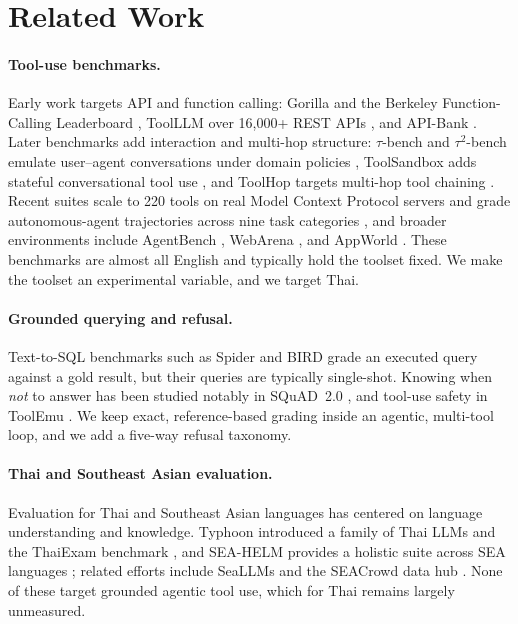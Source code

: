 \documentclass[11pt]{article}
\begin{document}
\section{Related Work}

\paragraph{Tool-use benchmarks.} Early work targets API and function calling: Gorilla
\citep{patil2023gorilla} and the Berkeley Function-Calling Leaderboard \citep{patil2025bfcl}, ToolLLM over
16{,}000+ REST APIs \citep{qin2023toolllm}, and API-Bank \citep{li2023apibank}. Later benchmarks add
interaction and multi-hop structure: $\tau$-bench and $\tau^2$-bench emulate user--agent conversations
under domain policies \citep{yao2024taubench,barres2025tau2bench}, ToolSandbox adds stateful
conversational tool use \citep{lu2024toolsandbox}, and ToolHop targets multi-hop tool chaining
\citep{ye2025toolhop}. Recent suites scale to 220 tools on real Model Context Protocol servers
\citep{bandi2026mcpatlas} and grade autonomous-agent trajectories across nine task categories
\citep{ye2026claweval}, and broader environments include AgentBench \citep{liu2023agentbench}, WebArena
\citep{zhou2023webarena}, and AppWorld \citep{trivedi2024appworld}. These benchmarks are almost all
English and typically hold the toolset fixed. We make the toolset an experimental variable, and we
target Thai.

\paragraph{Grounded querying and refusal.} Text-to-SQL benchmarks such as Spider \citep{yu2018spider} and
BIRD \citep{li2023bird} grade an executed query against a gold result, but their queries are typically
single-shot. Knowing when \emph{not} to answer has been studied notably in SQuAD~2.0
\citep{rajpurkar2018squad}, and tool-use safety in ToolEmu \citep{ruan2023toolemu}. We keep exact,
reference-based grading inside an agentic, multi-tool loop, and we add a five-way refusal taxonomy.

\paragraph{Thai and Southeast Asian evaluation.} Evaluation for Thai and Southeast Asian languages has
centered on language understanding and knowledge. Typhoon introduced a family of Thai LLMs and the
ThaiExam benchmark \citep{pipatanakul2023typhoon}, and SEA-HELM provides a holistic suite across SEA
languages \citep{susanto2025seahelm}; related efforts include SeaLLMs \citep{nguyen2023seallms} and the
SEACrowd data hub \citep{lovenia2024seacrowd}. None of these target grounded agentic tool use, which for
Thai remains largely unmeasured.
\end{document}
